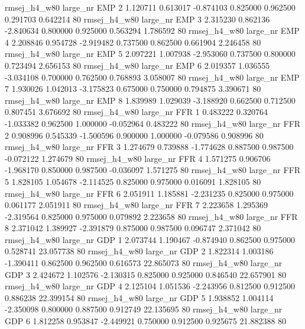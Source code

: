 rmsej_h4_w80   large_nr      EMP                 2  1.120711  0.613017  -0.874103 0.825000 0.962500  0.291703    0.642214 80
rmsej_h4_w80   large_nr      EMP                 3  2.315230  0.862136  -2.840634 0.800000 0.925000  0.563294    1.786592 80
rmsej_h4_w80   large_nr      EMP                 4  2.208846  0.954728  -2.919482 0.737500 0.862500  0.661904    2.246458 80
rmsej_h4_w80   large_nr      EMP                 5  2.097221  1.007938  -2.953060 0.737500 0.800000  0.723494    2.656153 80
rmsej_h4_w80   large_nr      EMP                 6  2.019357  1.036555  -3.034108 0.700000 0.762500  0.768893    3.058007 80
rmsej_h4_w80   large_nr      EMP                 7  1.930026  1.042013  -3.175823 0.675000 0.750000  0.794875    3.390671 80
rmsej_h4_w80   large_nr      EMP                 8  1.839989  1.029039  -3.188920 0.662500 0.712500  0.807451    3.676692 80
rmsej_h4_w80   large_nr      FFR                 1  0.483222  0.320764  -1.033382 0.962500 1.000000 -0.052964    0.483222 80
rmsej_h4_w80   large_nr      FFR                 2  0.908996  0.545339  -1.500596 0.900000 1.000000 -0.079586    0.908996 80
rmsej_h4_w80   large_nr      FFR                 3  1.274679  0.739888  -1.774628 0.887500 0.987500 -0.072122    1.274679 80
rmsej_h4_w80   large_nr      FFR                 4  1.571275  0.906706  -1.968170 0.850000 0.987500 -0.036097    1.571275 80
rmsej_h4_w80   large_nr      FFR                 5  1.828105  1.054678  -2.114525 0.825000 0.975000  0.016091    1.828105 80
rmsej_h4_w80   large_nr      FFR                 6  2.051911  1.185881  -2.231235 0.825000 0.975000  0.061177    2.051911 80
rmsej_h4_w80   large_nr      FFR                 7  2.223658  1.295369  -2.319564 0.825000 0.975000  0.079892    2.223658 80
rmsej_h4_w80   large_nr      FFR                 8  2.371042  1.389927  -2.391879 0.875000 0.987500  0.096747    2.371042 80
rmsej_h4_w80   large_nr      GDP                 1  2.073744  1.190467  -0.874940 0.862500 0.975000  0.528741   23.057738 80
rmsej_h4_w80   large_nr      GDP                 2  1.822314  1.003186  -1.390411 0.862500 0.962500  0.616573   22.865073 80
rmsej_h4_w80   large_nr      GDP                 3  2.424672  1.102576  -2.130315 0.825000 0.925000  0.846540   22.657901 80
rmsej_h4_w80   large_nr      GDP                 4  2.125104  1.051536  -2.243956 0.812500 0.912500  0.886238   22.399154 80
rmsej_h4_w80   large_nr      GDP                 5  1.938852  1.004114  -2.350098 0.800000 0.887500  0.912749   22.135695 80
rmsej_h4_w80   large_nr      GDP                 6  1.812258  0.953847  -2.449921 0.750000 0.912500  0.925675   21.882388 80

